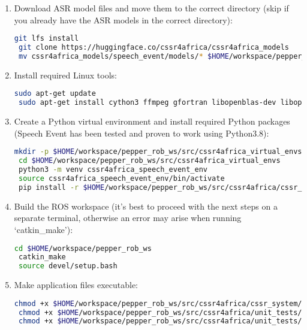 \documentclass{CSSRforAfrica}
\begin{document}
\begin{enumerate}
    \item Download ASR model files and move them to the correct directory (skip if you already have the ASR models in the correct directory):
    \begin{lstlisting}[language=bash]
 git lfs install
 git clone https://huggingface.co/cssr4africa/cssr4africa_models
 mv cssr4africa_models/speech_event/models/* $HOME/workspace/pepper_rob_ws/src/cssr4africa/cssr_system/speech_event/models
    \end{lstlisting}
    \item Install required Linux tools:
    \begin{lstlisting}[language=bash]
 sudo apt-get update
 sudo apt-get install cython3 ffmpeg gfortran libopenblas-dev libopenblas64-dev patchelf pkg-config portaudio19-dev python3-testresources python3-tk python3-typing-extensions sox
    \end{lstlisting}
    \item Create a Python virtual environment and install required Python packages (Speech Event has been tested and proven to work using Python3.8): 
    \begin{lstlisting}[language=bash]
 mkdir -p $HOME/workspace/pepper_rob_ws/src/cssr4africa_virtual_envs
 cd $HOME/workspace/pepper_rob_ws/src/cssr4africa_virtual_envs
 python3 -m venv cssr4africa_speech_event_env
 source cssr4africa_speech_event_env/bin/activate
 pip install -r $HOME/workspace/pepper_rob_ws/src/cssr4africa/cssr_system/speech_event/speech_event_requirements.txt
    \end{lstlisting}
    \item Build the ROS workspace (it's best to proceed with the next steps on a separate terminal, otherwise an error may arise when running `catkin\_make'):
    \begin{lstlisting}[language=bash]
 cd $HOME/workspace/pepper_rob_ws
 catkin_make
 source devel/setup.bash
    \end{lstlisting}
    \item Make application files executable:
    \begin{lstlisting}[language=bash]
 chmod +x $HOME/workspace/pepper_rob_ws/src/cssr4africa/cssr_system/speech_event/src/speech_event_application.py
 chmod +x $HOME/workspace/pepper_rob_ws/src/cssr4africa/unit_tests/speech_event_test/src/speech_event_test_application.py
 chmod +x $HOME/workspace/pepper_rob_ws/src/cssr4africa/unit_tests/speech_event_test/src/speech_event_driver.py
    \end{lstlisting}
\end{enumerate}
\end{document}
